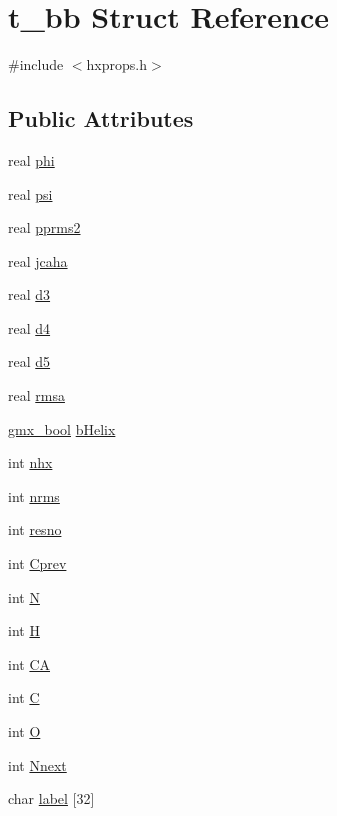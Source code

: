 \hypertarget{structt__bb}{\section{t\-\_\-bb \-Struct \-Reference}
\label{structt__bb}
}


{\ttfamily \#include $<$hxprops.\-h$>$}

\subsection*{\-Public \-Attributes}
\begin{DoxyCompactItemize}
\item 
real \hyperlink{structt__bb_a41b7e3b7929f9d886a14901a9c6c263b}{phi}
\item 
real \hyperlink{structt__bb_a147862a6ed22146e070c8237288331e2}{psi}
\item 
real \hyperlink{structt__bb_a78c15709cb11b2e62bf13c01ecbb6368}{pprms2}
\item 
real \hyperlink{structt__bb_a4d63399a8d194d80531f574a4eb36f7f}{jcaha}
\item 
real \hyperlink{structt__bb_a46dd024bb3ba62d1928b9b4031b3644e}{d3}
\item 
real \hyperlink{structt__bb_a2572ec60d6d6c28a89e589d067afed16}{d4}
\item 
real \hyperlink{structt__bb_aa792b3be1a8cebc5a70c0354e7666bf1}{d5}
\item 
real \hyperlink{structt__bb_afb93d2d5ca80b84111289b7e22829a23}{rmsa}
\item 
\hyperlink{include_2types_2simple_8h_a8fddad319f226e856400d190198d5151}{gmx\-\_\-bool} \hyperlink{structt__bb_a48c50f40d59ad266202feb100567d843}{b\-Helix}
\item 
int \hyperlink{structt__bb_a21cae00a89fd32fdfbaf293490545373}{nhx}
\item 
int \hyperlink{structt__bb_a0c93d6a788c2a3a0a3d8441431fd8f22}{nrms}
\item 
int \hyperlink{structt__bb_abca4d481eed4ccaa0da8b034f14b3e45}{resno}
\item 
int \hyperlink{structt__bb_a749999610903f9c2549749129930b9bf}{\-Cprev}
\item 
int \hyperlink{structt__bb_a2c279be328d04ac7247efa125396a9fe}{\-N}
\item 
int \hyperlink{structt__bb_a3311f1eb68f74dd9b203c4e6e972c415}{\-H}
\item 
int \hyperlink{structt__bb_aabd0ee2d5ea08bc62412d45cdf0f1861}{\-C\-A}
\item 
int \hyperlink{structt__bb_ae25f5c4cb81fcaa339a867a43396545f}{\-C}
\item 
int \hyperlink{structt__bb_a5b3ca2cbf9e06eb431db389e0962261f}{\-O}
\item 
int \hyperlink{structt__bb_ad223cd6a59d5e077cc565766f6f237f5}{\-Nnext}
\item 
char \hyperlink{structt__bb_a5b6e017ab3cbd74aa11f89d48d7855ff}{label} \mbox{[}32\mbox{]}
\end{DoxyCompactItemize}


